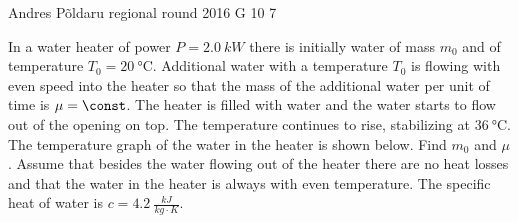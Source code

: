 \documentclass[11pt]{article}
\begin{document}
{Andres Põldaru} %
{regional round} %
{2016} %
{G 10} %
{7} %
{

\ifEngStatement
In a water heater of power $P=\SI{2.0}{kW}$ there is initially water of mass $m_0$ and of temperature $T_0=\SI{20}{\degreeCelsius}$. Additional water with a temperature $T_0$ is flowing with even speed into the heater so that the mass of the additional water per unit of time is $\mu=\const$. The heater is filled with water and the water starts to flow out of the opening on top. The temperature continues to rise, stabilizing at $\SI{36}{\degreeCelsius}$. The temperature graph of the water in the heater is shown below. Find $m_0$ and $\mu$. Assume that besides the water flowing out of the heater there are no heat losses and that the water in the heater is always with even temperature. The specific heat of water is $c=\SI{4.2}{\frac{kJ}{kg\cdot K}}$.\\
\fi
}
\end{document}

